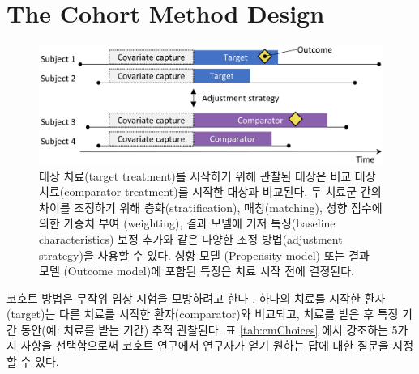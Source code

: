 \documentclass[11pt]{book}
\theoremstyle{definition}
\theoremstyle{definition}
\theoremstyle{definition}
\theoremstyle{remark}
\begin{document}
\section{The Cohort Method Design}\label{CohortMethod}


\begin{figure}

{\centering \includegraphics[width=0.9\linewidth]{images/PopulationLevelEstimation/cohortMethod} 

}

\caption{대상 치료(target treatment)를 시작하기 위해 관찰된 대상은 비교 대상 치료(comparator treatment)를 시작한 대상과 비교된다. 두 치료군 간의 차이를 조정하기 위해 층화(stratification), 매칭(matching), 성향 점수에 의한 가중치 부여 (weighting), 결과 모델에 기저 특징(baseline characteristics) 보정 추가와 같은 다양한 조정 방법(adjustment strategy)을 사용할 수 있다. 성향 모델 (Propensity model) 또는 결과 모델 (Outcome model)에 포함된 특징은 치료 시작 전에 결정된다.}\label{fig:cohortMethod}
\end{figure}

코호트 방법은 무작위 임상 시험을 모방하려고 한다 \citep{hernan_2016}.
하나의 치료를 시작한 환자(target)는 다른 치료를 시작한
환자(comparator)와 비교되고, 치료를 받은 후 특정 기간 동안(예: 치료를
받는 기간) 추적 관찰된다. 표 \ref{tab:cmChoices} 에서 강조하는 5가지
사항을 선택함으로써 코호트 연구에서 연구자가 얻기 원하는 답에 대한
질문을 지정할 수 있다. 
 
\end{document}
